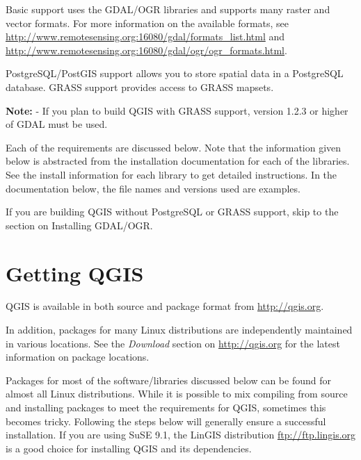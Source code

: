 Basic support uses the GDAL/OGR libraries and supports many raster and vector formats. For more information on the available formats, see \url{http://www.remotesensing.org:16080/gdal/formats\_list.html} and \url{http://www.remotesensing.org:16080/gdal/ogr/ogr\_formats.html}.

PostgreSQL/PostGIS support allows you to store spatial data in a PostgreSQL database. GRASS support provides access to GRASS mapsets. 

\textbf{Note:} - If you plan to build QGIS with GRASS support, version 1.2.3 or higher of GDAL must be used. 
  
Each of the requirements are discussed below. Note that the information given below is abstracted from the installation documentation for each of the libraries. See the install information for each library to get detailed instructions. In the documentation below, the file names and versions used are examples.


If you are building QGIS without PostgreSQL or GRASS support, skip to the section on Installing GDAL/OGR. 
\section{Getting QGIS}
QGIS is available in both source and package format from \url{http://qgis.org}. 

In addition, packages for many Linux distributions are independently maintained in various locations. See 
the \textit{Download} section on \url{http://qgis.org} for the latest information on package locations.

Packages for most of the software/libraries discussed below can be found for almost all Linux distributions. While it is possible to mix compiling from source and installing packages to meet the requirements for QGIS, sometimes this becomes tricky. Following the steps below will generally ensure a successful installation. If you are using SuSE 9.1, the LinGIS distribution \url{ftp://ftp.lingis.org} is a good choice for installing QGIS and its dependencies.


